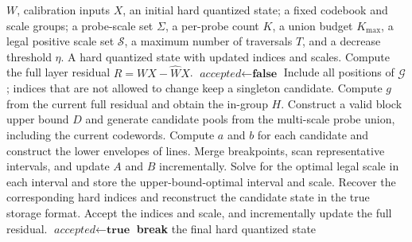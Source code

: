 \begin{algorithm}[t]
\caption{Joint codeword optimization under a shared scale}
\label{alg:joint}
\begin{algorithmic}[1]
\Require
$W$, calibration inputs $X$, an initial hard quantized state; a fixed codebook and scale groups; a probe-scale set $\Sigma$, a per-probe count $K$, a union budget $K_{\max}$, a legal positive scale set $\mathcal S$, a maximum number of traversals $T$, and a decrease threshold $\eta$.
\Ensure
A hard quantized state with updated indices and scales.
\State
Compute the full layer residual $R = WX - \widehat W X$.
    \State
    $\textit{accepted} \gets \textbf{false}$
        \State
        Include all positions of $\mathcal G$; indices that are not allowed to change keep a singleton candidate.
        \State
        Compute $g$ from the current full residual and obtain the in-group $H$.
        \State
        Construct a valid block upper bound $D$ and generate candidate pools from the multi-scale probe union, including the current codewords.
        \State
        Compute $a$ and $b$ for each candidate and construct the lower envelopes of lines.
        \State
        Merge breakpoints, scan representative intervals, and update $A$ and $B$ incrementally.
        \State
        Solve for the optimal legal scale in each interval and store the upper-bound-optimal interval and scale.
        \State
        Recover the corresponding hard indices and reconstruct the candidate state in the true storage format.
            \State
            Accept the indices and scale, and incrementally update the full residual.
            \State $\textit{accepted} \gets \textbf{true}$
        \EndIf
    \EndFor
        \State
        \textbf{break}
    \EndIf
\EndFor
\State
\Return the final hard quantized state
\end{algorithmic}
\end{algorithm}
